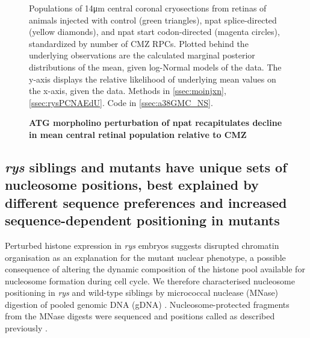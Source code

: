 \begin{figure}[!h]
    \caption{{\bf ATG morpholino perturbation of npat recapitulates decline in mean  central retinal population relative to CMZ}}
    Populations of 14\si{\micro\metre} central coronal cryosections from retinas of animals injected with control (green triangles), npat splice-directed (yellow diamonds), and npat start codon-directed (magenta circles), standardized by number of CMZ RPCs. Plotted behind the underlying observations are the calculated marginal posterior distributions of the mean, given log-Normal models of the data. The y-axis displays the relative likelihood of underlying mean values on the x-axis, given the data.
    Methods in \autoref{ssec:moinjxn}, \autoref{ssec:rysPCNAEdU}.
    Code in \autoref{ssec:a38GMC_NS}.
    \label{morphonucstudy}
\end{figure}

\subsection{\textit{rys} siblings and mutants have unique sets of nucleosome positions, best explained by different sequence preferences and increased sequence-dependent positioning in mutants}
 Perturbed histone expression in \textit{rys} embryos suggests disrupted chromatin organisation as an explanation for the mutant nuclear phenotype, a possible consequence of altering the dynamic composition of the histone pool available for nucleosome formation during cell cycle. We therefore characterised nucleosome positioning in \textit{rys} and wild-type siblings by micrococcal nuclease (MNase) digestion of pooled genomic DNA (gDNA) \cite{Cui2012}. Nucleosome-protected fragments from the MNase digests were sequenced and positions called as described previously \cite{Chen2013}.

